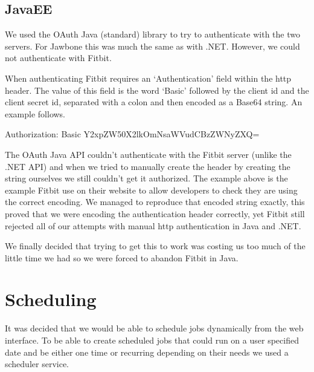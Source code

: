 \subsection{JavaEE}
We used the OAuth Java (standard) library to try to authenticate with the two servers. For Jawbone this was much the same as with .NET. However, we could not authenticate with Fitbit. \par
When authenticating Fitbit requires an ‘Authentication’ field within the http header. The value of this field is the word ‘Basic’ followed by the client id and the client secret id, separated with a colon and then encoded as a Base64 string. An example follows. \par
Authorization: Basic Y2xpZW50X2lkOmNsaWVudCBzZWNyZXQ= \par
The OAuth Java API couldn’t authenticate with the Fitbit server (unlike the .NET API) and when we tried to manually create the header by creating the string ourselves we still couldn’t get it authorized. The example above is the example Fitbit use on their website to allow developers to check they are using the correct encoding. We managed to reproduce that encoded string exactly, this proved that we were encoding the authentication header correctly, yet Fitbit still rejected all of our attempts with manual http authentication in Java and .NET. \par
We finally decided that trying to get this to work was costing us too much of the little time we had so we were forced to abandon Fitbit in Java.
\section{Scheduling}
It was decided that we would be able to schedule jobs dynamically from the web interface. To be able to create scheduled jobs that could run on a user specified date and be either one time or recurring depending on their needs we used a scheduler service. 
